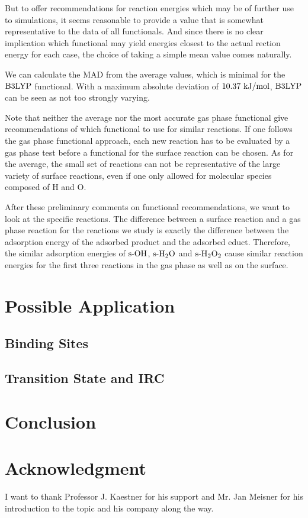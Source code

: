 \documentclass[8.5pt,twoside,twocolumn]{article}
\newcommand\sur{\enmat{\te{s-}}}
\newcommand\kmo{\enmat{\te {kJ/mol}}}
\theoremstyle{standard}
\begin{document}
But to offer recommendations for reaction energies which may be of further
use to simulations, it seems reasonable to provide a value that is somewhat
representative to the data of all functionals. And since there is no
clear implication which functional may yield energies closest to the actual
rection energy for each case, the choice of taking a simple mean value comes naturally.

We can calculate the MAD from the average values, which is minimal for the $\text{B3LYP}$ functional.
With a maximum absolute deviation of $10.37~\kmo$, $\text{B3LYP}$ can be seen as not too strongly
varying.

Note that neither the average nor the most accurate gas phase functional give recommendations
of which functional to use for similar reactions. If one follows the gas phase functional
approach, each new reaction has to be evaluated by a gas phase test before a functional
for the surface reaction can be chosen. As for the average, the small set of
reactions can not be representative of the large variety of surface reactions,
even if one only allowed for molecular species composed of H and O. 

After these preliminary comments on functional recommendations, we want to look at the
specific reactions. The difference between a surface reaction and a gas phase reaction
for the reactions we study is exactly the difference between the adsorption energy
of the adsorbed product and the adsorbed educt. Therefore, the similar adsorption
energies of $\sur\ho$, $\sur\hto$ and $\sur\htot$ cause similar reaction energies
for the first three reactions in the gas phase as well as on the surface. 

\section{Possible Application}
\subsection{Binding Sites}
\label{Sec:Adv:Binding}


\subsection{Transition State and IRC}
\label{Sec:Adv:IRC}

\newpage

\section{Conclusion}
\label{Sec:Con}

\section*{Acknowledgment}
I want to thank Professor J. Kaestner for his support and Mr. Jan Meisner for
his introduction to the topic and his company along the way.


% 

%
{}
\end{document}
